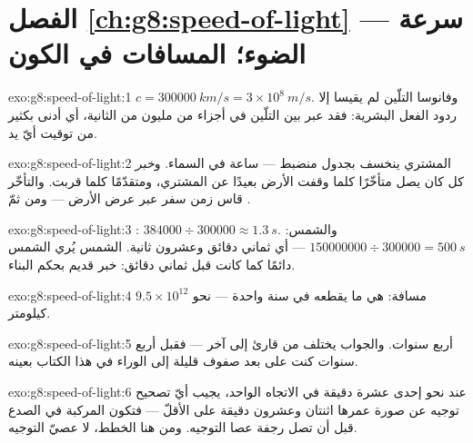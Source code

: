 \section*{الفصل \ref{ch:g8:speed-of-light} --- سرعة الضوء؛ المسافات في الكون}

\begin{solution}{exo:g8:speed-of-light:1}
$c = \qty{300000}{km/s} = 3 \times 10^{8}\ \unit{m/s}$.
وفانوسا التلّين لم يقيسا إلا ردود الفعل البشرية: فقد عبر
 بين التلّين في أجزاء من مليون من الثانية، أي أدنى بكثير
من توقيت أيّ يد.
\end{solution}

\begin{solution}{exo:g8:speed-of-light:2}
 المشتري ينخسف بجدول منضبط --- ساعة في السماء. و\emph{خبر}
كل  كان يصل متأخّرًا كلما وقفت الأرض بعيدًا عن المشتري،
ومتقدّمًا كلما قربت. والتأخّر قاس زمن سفر  عبر عرض 
الأرض --- ومن ثمّ  .
\end{solution}

\begin{solution}{exo:g8:speed-of-light:3}
: $384000 \div 300000 \approx \qty{1.3}{s}$. والشمس:
$150000000 \div 300000 = \qty{500}{s}$ --- أي ثماني دقائق
وعشرون ثانية.  الشمس يُري الشمس دائمًا كما كانت قبل ثماني
دقائق: خبر قديم بحكم البناء.
\end{solution}

\begin{solution}{exo:g8:speed-of-light:4}
مسافة: هي ما يقطعه  في سنة واحدة --- نحو
$9.5 \times 10^{12}$ كيلومتر.
\end{solution}

\begin{solution}{exo:g8:speed-of-light:5}
أربع سنوات. والجواب يختلف من قارئ إلى آخر --- فقبل أربع سنوات
كنت على بعد صفوف قليلة إلى الوراء في هذا الكتاب بعينه.
\end{solution}

\begin{solution}{exo:g8:speed-of-light:6}
عند نحو إحدى عشرة دقيقة في الاتجاه الواحد، يجيب أيّ تصحيح
توجيه عن صورة عمرها اثنتان وعشرون دقيقة على الأقلّ --- فتكون
المركبة في الصدع قبل أن تصل رجفة عصا التوجيه. ومن هنا الخطط،
لا عصيّ التوجيه.
\end{solution}

